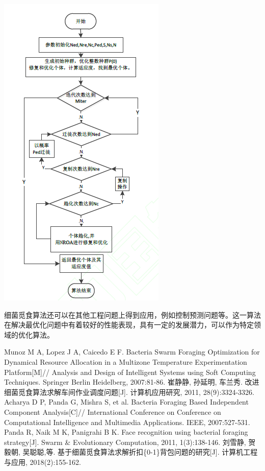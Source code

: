\documentclass{article}
\begin{document}
\begin{center}
\includegraphics[scale=1]{sflow.png}
\end{center}

\vspace{2em}
细菌觅食算法还可以在其他工程问题上得到应用，例如控制预测问题等。这一算法在解决最优化问题中有着较好的性能表现，具有一定的发展潜力，可以作为特定领域的优化算法。



\begin{thebibliography}{20}
Munoz M A, Lopez J A, Caicedo E F. Bacteria Swarm Foraging Optimization for Dynamical Resource Allocation in a Multizone Temperature Experimentation Platform[M]// Analysis and Design of Intelligent Systems using Soft Computing Techniques. Springer Berlin Heidelberg, 2007:81-86.
崔静静, 孙延明, 车兰秀. 改进细菌觅食算法求解车间作业调度问题[J]. 计算机应用研究, 2011, 28(9):3324-3326.
Acharya D P, Panda G, Mishra S, et al. Bacteria Foraging Based Independent Component Analysis[C]// International Conference on Conference on Computational Intelligence and Multimedia Applications. IEEE, 2007:527-531.
Panda R, Naik M K, Panigrahi B K. Face recognition using bacterial foraging strategy[J]. Swarm \& Evolutionary Computation, 2011, 1(3):138-146.
刘雪静, 贺毅朝, 吴聪聪,等. 基于细菌觅食算法求解折扣\{0-1\}背包问题的研究[J]. 计算机工程与应用, 2018(2):155-162.
\end{thebibliography}
\end{document}
